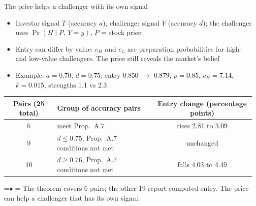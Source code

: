 \documentclass[10pt,aspectratio=169]{beamer}
\newcommand{\TakeawayBody}[1]{\begin{minipage}{\textwidth}\raggedright\normalsize
    \setbox0=\hbox{{\usebeamercolor[fg]{structure}\raise0.7pt\hbox{\scriptsize$\bullet$}}\hspace{0.55em}}%
    \hangindent=\wd0 \hangafter=1 \noindent\box0 #1\par
  \end{minipage}}
\renewcommand{\Takeaway}[2][\ExhibitReadingGap]{\par\vspace{#1}\noindent\TakeawayBody{#2}\par}
\newcommand{\NavGap}{\par\vspace{0.45cm}}%
\let\AdapterBackButton\BackButton
\renewcommand{\BackButton}[1]{\NavGap\AdapterBackButton{#1}}%
\begin{document}
\begin{frame}[label=A6]{The price helps a challenger with its own signal}
\hypertarget{app:signals}{}
{\small
\begin{itemize}\setlength{\itemsep}{3pt}
\item Investor signal $T$ (accuracy $a$), challenger signal $Y$ (accuracy $d$); the challenger uses $\Pr(H\mid P,\,Y=y)$, $P$ = stock price
\item Entry can differ by value: $e_H$ and $e_L$ are preparation probabilities for high- and low-value challengers. The price still reveals the market's belief
\item Example: $a=0.70$, %
$d=0.75$: %
entry 0.850 %
$\to$ 0.879; %
$\rho=0.85$, %
$c_H=7.14$, %
$k=0.015$, %
strengths 1.1 %
vs 2.3 %
\end{itemize}}
\vspace{2pt}
\begin{center}\small
\begin{tabular}{@{}clc@{}}
\toprule
Pairs (25 total) & Group of accuracy pairs & Entry change (percentage points)\\
\midrule
6 & meet Prop.~A.7 & rises 2.81 to 3.09\\
9 & $d\le0.75$, Prop.~A.7 conditions not met & unchanged\\
10 & $d\ge0.76$, Prop.~A.7 conditions not met & falls 4.03 to 4.49\\
\bottomrule
\end{tabular}
\end{center}
\Takeaway{The theorem covers 6 pairs; the other 19 report computed entry. The price can help a challenger that has its own signal.}
\end{frame}
\end{document}
